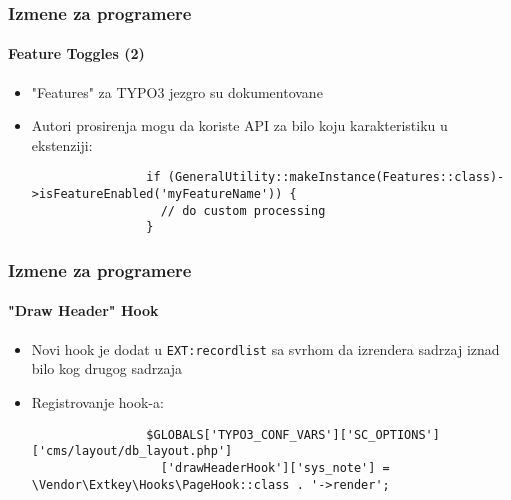 \begin{frame}[fragile]
	\frametitle{Izmene za programere}
	\framesubtitle{Feature Toggles (2)}

	\lstset{basicstyle=\tiny\ttfamily}

	\begin{itemize}

		\item "Features" za TYPO3 jezgro su dokumentovane

		\item Autori prosirenja mogu da koriste API za bilo koju karakteristiku u ekstenziji:

			\begin{lstlisting}
				if (GeneralUtility::makeInstance(Features::class)->isFeatureEnabled('myFeatureName')) {
				  // do custom processing
				}
			\end{lstlisting}

	\end{itemize}

\end{frame}


\begin{frame}[fragile]
	\frametitle{Izmene za programere}
	\framesubtitle{"Draw Header" Hook}

	\lstset{basicstyle=\tiny\ttfamily}

	\begin{itemize}
		\item Novi hook je dodat u \texttt{EXT:recordlist}
			sa svrhom da izrendera sadrzaj iznad bilo kog drugog sadrzaja
			
		\item Registrovanje hook-a:

			\begin{lstlisting}
				$GLOBALS['TYPO3_CONF_VARS']['SC_OPTIONS']['cms/layout/db_layout.php']
				  ['drawHeaderHook']['sys_note'] = \Vendor\Extkey\Hooks\PageHook::class . '->render';
			\end{lstlisting}

	\end{itemize}

\end{frame}

